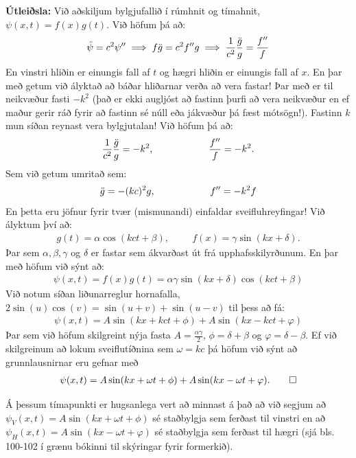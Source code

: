 \ifdefined \wholebook \else\documentclass[oneside]{book}\usepackage{EdlBook}\graphicspath{{figures/}}
\begin{document}
\textbf{Útleiðsla:} Við aðskiljum bylgjufallið í rúmhnit og tímahnit, $\psi(x,t) = f(x)g(t)$. Við höfum þá að:
\begin{align*}
    \Ddot{\psi} = c^2 \psi'' \implies f\Ddot{g} = c^2f'' g \implies \frac{1}{c^2} \frac{\Ddot{g}}{g} = \frac{f''}{f}
\end{align*}
En vinstri hliðin er einungis fall af $t$ og hægri hliðin er einungis fall af $x$. En þar með getum við ályktað að báðar hliðarnar verða að vera fastar! Þar með er til neikvæður fasti $-k^2$ (það er ekki augljóst að fastinn þurfi að vera neikvæður en ef maður gerir ráð fyrir að fastinn sé núll eða jákvæður þá fæst mótsögn!). Fastinn $k$ mun síðan reynast vera bylgjutalan! Við höfum þá að:
\begin{align*}
    \frac{1}{c^2} \frac{\Ddot{g}}{g} = -k^2, \hspace{2cm} \frac{f''}{f} = -k^2.
\end{align*}
Sem við getum umritað sem:
\begin{align*}
    \Ddot{g} = -(kc)^2g, \hspace{2cm} f'' = -k^2 f
\end{align*}
En þetta eru jöfnur fyrir tvær (mismunandi) einfaldar sveifluhreyfingar! Við ályktum því að:
\begin{align*}
    g(t) = \alpha \cos(kct + \beta), \hspace{1cm} f(x) = \gamma \sin(kx + \delta).
\end{align*}
Þar sem $\alpha, \beta, \gamma$ og $\delta$ er fastar sem ákvarðast út frá upphafsskilyrðunum. En þar með höfum við sýnt að:
\begin{align*}
\psi(x,t) = f(x)g(t) = \alpha \gamma \sin(kx + \delta) \cos(kct + \beta)
\end{align*}
Við notum síðan liðunarreglur hornafalla, $2\sin(u)\cos(v) = \sin(u+v) + \sin(u-v)$ til þess að fá:
\begin{align*}
    \psi(x,t) = A\sin(kx+kct + \phi) + A\sin(kx-kct + \varphi)
\end{align*}
Þar sem við höfum skilgreint nýja fasta $A = \frac{\alpha \gamma}{2}$, $\phi = \delta + \beta$ og $\varphi = \delta - \beta$. Ef við skilgreinum að lokum sveiflutíðnina sem $\omega = kc$ þá höfum við sýnt að grunnlausnirnar eru gefnar með
\begin{align*}
    \psi(x,t) = A\sin(kx + \omega t + \phi) + A\sin(kx - \omega t + \varphi). \qedhere
\end{align*}

Á þessum tímapunkti er hugsanlega vert að minnast á það að við segjum að $\psi_V(x,t) = A\sin(kx+\omega t + \phi)$ sé staðbylgja sem ferðast til vinstri en að $\psi_H(x,t) = A\sin(kx - \omega t + \varphi)$ sé staðbylgja sem ferðast til hægri (sjá bls. 100-102 í grænu bókinni til skýringar fyrir formerkið). 
\end{document}
